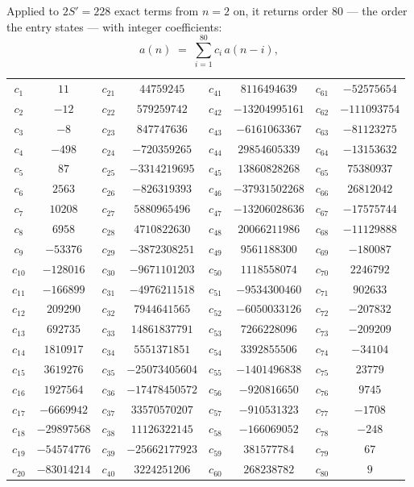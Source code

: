 \documentclass[11pt,a4paper]{article}
\theoremstyle{plain}
\theoremstyle{definition}
\begin{document}
Applied to $2S'=228$ exact terms from $n=2$ on, it returns order $80$ --- the
order the entry states --- with integer coefficients:
\[
a(n)\;=\;\sum_{i=1}^{80}c_i\,a(n-i),
\]
\begin{center}\small
\begin{tabular}{cccccccc}
$c_{1}$ & $11$ & $c_{21}$ & $44759245$ & $c_{41}$ & $8116494639$ & $c_{61}$ & $-52575654$ \\
$c_{2}$ & $-12$ & $c_{22}$ & $579259742$ & $c_{42}$ & $-13204995161$ & $c_{62}$ & $-111093754$ \\
$c_{3}$ & $-8$ & $c_{23}$ & $847747636$ & $c_{43}$ & $-6161063367$ & $c_{63}$ & $-81123275$ \\
$c_{4}$ & $-498$ & $c_{24}$ & $-720359265$ & $c_{44}$ & $29854605339$ & $c_{64}$ & $-13153632$ \\
$c_{5}$ & $87$ & $c_{25}$ & $-3314219695$ & $c_{45}$ & $13860828268$ & $c_{65}$ & $75380937$ \\
$c_{6}$ & $2563$ & $c_{26}$ & $-826319393$ & $c_{46}$ & $-37931502268$ & $c_{66}$ & $26812042$ \\
$c_{7}$ & $10208$ & $c_{27}$ & $5880965496$ & $c_{47}$ & $-13206028636$ & $c_{67}$ & $-17575744$ \\
$c_{8}$ & $6958$ & $c_{28}$ & $4710822630$ & $c_{48}$ & $20066211986$ & $c_{68}$ & $-11129888$ \\
$c_{9}$ & $-53376$ & $c_{29}$ & $-3872308251$ & $c_{49}$ & $9561188300$ & $c_{69}$ & $-180087$ \\
$c_{10}$ & $-128016$ & $c_{30}$ & $-9671101203$ & $c_{50}$ & $1118558074$ & $c_{70}$ & $2246792$ \\
$c_{11}$ & $-166899$ & $c_{31}$ & $-4976211518$ & $c_{51}$ & $-9534300460$ & $c_{71}$ & $902633$ \\
$c_{12}$ & $209290$ & $c_{32}$ & $7944641565$ & $c_{52}$ & $-6050033126$ & $c_{72}$ & $-207832$ \\
$c_{13}$ & $692735$ & $c_{33}$ & $14861837791$ & $c_{53}$ & $7266228096$ & $c_{73}$ & $-209209$ \\
$c_{14}$ & $1810917$ & $c_{34}$ & $5551371851$ & $c_{54}$ & $3392855506$ & $c_{74}$ & $-34104$ \\
$c_{15}$ & $3619276$ & $c_{35}$ & $-25073405604$ & $c_{55}$ & $-1401496838$ & $c_{75}$ & $23779$ \\
$c_{16}$ & $1927564$ & $c_{36}$ & $-17478450572$ & $c_{56}$ & $-920816650$ & $c_{76}$ & $9745$ \\
$c_{17}$ & $-6669942$ & $c_{37}$ & $33570570207$ & $c_{57}$ & $-910531323$ & $c_{77}$ & $-1708$ \\
$c_{18}$ & $-29897568$ & $c_{38}$ & $11126322145$ & $c_{58}$ & $-166069052$ & $c_{78}$ & $-248$ \\
$c_{19}$ & $-54574776$ & $c_{39}$ & $-25662177923$ & $c_{59}$ & $381577784$ & $c_{79}$ & $67$ \\
$c_{20}$ & $-83014214$ & $c_{40}$ & $3224251206$ & $c_{60}$ & $268238782$ & $c_{80}$ & $9$ \\
\end{tabular}
\end{center}
\end{document}
